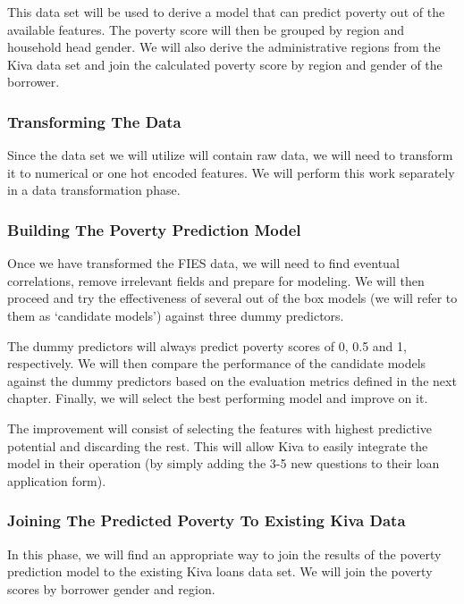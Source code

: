 \documentclass{article}
\begin{document}
This data set will be used to derive a model that can predict poverty out of the available features. The poverty score will then be grouped by region and household head gender. We will also derive the administrative regions from the Kiva data set and join the calculated poverty score by region and gender of the borrower.

\subsubsection{Transforming The Data}
Since the data set we will utilize will contain raw data, we will need to transform it to numerical or one hot encoded features. We will perform this work separately in a data transformation phase.
\subsubsection{Building The Poverty Prediction Model}
Once we have transformed the FIES data, we will need to find eventual correlations, remove irrelevant fields and prepare for modeling. We will then proceed and try the effectiveness of several out of the box models (we will refer to them as ‘candidate models’) against three dummy predictors.

The dummy predictors will always predict poverty scores of 0, 0.5 and 1, respectively. We will then compare the performance of the candidate models against the dummy predictors based on the evaluation metrics defined in the next chapter. Finally, we will select the best performing model and improve on it.

The improvement will consist of selecting the features with highest predictive potential and discarding the rest. This will allow Kiva to easily integrate the model in their operation (by simply adding the 3-5 new questions to their loan application form).
\subsubsection{Joining The Predicted Poverty To Existing Kiva Data}
In this phase, we will find an appropriate way to join the results of the poverty prediction model to the existing Kiva loans data set. We will join the poverty scores by borrower gender and region.
\end{document}

